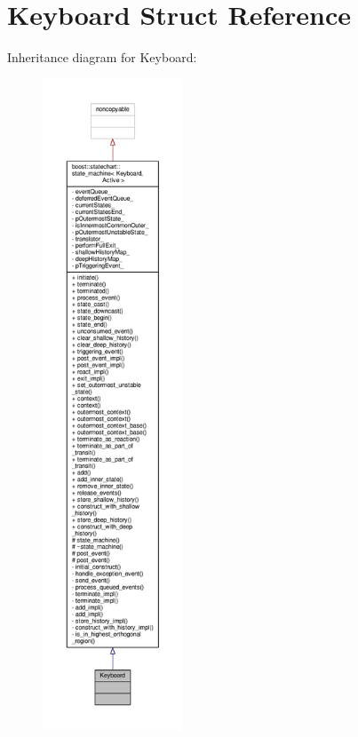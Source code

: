 \hypertarget{struct_keyboard}{}\section{Keyboard Struct Reference}
\label{struct_keyboard}


Inheritance diagram for Keyboard\+:
\nopagebreak
\begin{figure}[H]
\begin{center}
\leavevmode
\includegraphics[height=550pt]{struct_keyboard__inherit__graph}
\end{center}
\end{figure}



